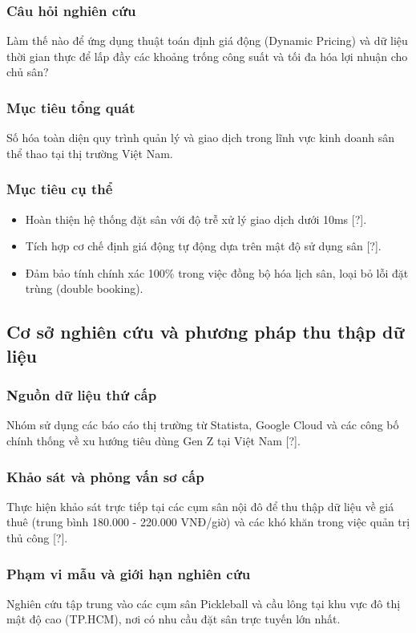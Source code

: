 \subsubsection{Câu hỏi nghiên cứu}
Làm thế nào để ứng dụng thuật toán định giá động (Dynamic Pricing) và dữ liệu thời gian thực để lấp đầy các khoảng trống công suất và tối đa hóa lợi nhuận cho chủ sân?

\subsubsection{Mục tiêu tổng quát}
Số hóa toàn diện quy trình quản lý và giao dịch trong lĩnh vực kinh doanh sân thể thao tại thị trường Việt Nam.

\subsubsection{Mục tiêu cụ thể}
\begin{itemize}
    \item Hoàn thiện hệ thống đặt sân với độ trễ xử lý giao dịch dưới 10ms [?].
    \item Tích hợp cơ chế định giá động tự động dựa trên mật độ sử dụng sân [?].
    \item Đảm bảo tính chính xác 100\% trong việc đồng bộ hóa lịch sân, loại bỏ lỗi đặt trùng (double booking).
\end{itemize}

\subsection{Cơ sở nghiên cứu và phương pháp thu thập dữ liệu}
\subsubsection{Nguồn dữ liệu thứ cấp}
Nhóm sử dụng các báo cáo thị trường từ Statista, Google Cloud và các công bố chính thống về xu hướng tiêu dùng Gen Z tại Việt Nam [?].

\subsubsection{Khảo sát và phỏng vấn sơ cấp}
Thực hiện khảo sát trực tiếp tại các cụm sân nội đô để thu thập dữ liệu về giá thuê (trung bình 180.000 - 220.000 VNĐ/giờ) và các khó khăn trong việc quản trị thủ công [?].

\subsubsection{Phạm vi mẫu và giới hạn nghiên cứu}
Nghiên cứu tập trung vào các cụm sân Pickleball và cầu lông tại khu vực đô thị mật độ cao (TP.HCM), nơi có nhu cầu đặt sân trực tuyến lớn nhất.

